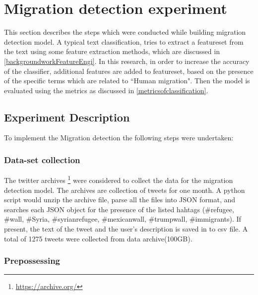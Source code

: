 \section{Migration detection experiment} \label{migration_detection_experiment}
This section describes the steps which were conducted while building migration detection model. A typical text classification, tries to extract a featureset from the text using some feature extraction methods, which are discussed in \ref{backgroundworkFeatureEngi}. In this research, in order to increase the accuracy of the classifier, additional features are added to featureset, based on the presence of the specific terms which are related to ``Human migration". Then the model is evaluated using the metrics as discussed in \ref{metricsofclassification}.    

\subsection{Experiment Description}
To implement the Migration detection the following steps were undertaken:

\subsubsection{Data-set collection}
The twitter archives \footnote{\url{https://archive.org/}} were considered to collect the data for the migration detection model. The archives are collection of tweets for one month. A python script would unzip the archive file, parse all the files into JSON format, and searches each JSON object for the presence of the listed hahtags (\#refugee, \#wall, \#Syria, \#syrianrefugee,
\#mexicanwall, \#trumpwall, \#immigrants). If present, the text of the tweet and the user's description is saved in to csv file.  A total of 1275 tweets were collected from data archive(100GB).



\subsubsection{Prepossessing} \label{sssec:preprocessing}

